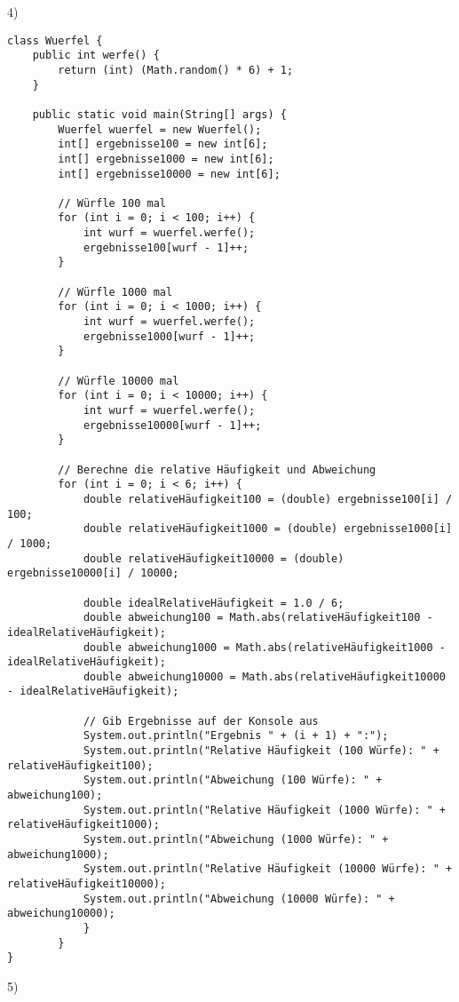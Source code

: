 \documentclass[fontsize=12pt]{article}
\begin{document}
4)
\begin{verbatim}
class Wuerfel {
    public int werfe() {
        return (int) (Math.random() * 6) + 1;
    }

    public static void main(String[] args) {
        Wuerfel wuerfel = new Wuerfel();
        int[] ergebnisse100 = new int[6];
        int[] ergebnisse1000 = new int[6];
        int[] ergebnisse10000 = new int[6];

        // Würfle 100 mal
        for (int i = 0; i < 100; i++) {
            int wurf = wuerfel.werfe();
            ergebnisse100[wurf - 1]++;
        }

        // Würfle 1000 mal
        for (int i = 0; i < 1000; i++) {
            int wurf = wuerfel.werfe();
            ergebnisse1000[wurf - 1]++;
        }

        // Würfle 10000 mal
        for (int i = 0; i < 10000; i++) {
            int wurf = wuerfel.werfe();
            ergebnisse10000[wurf - 1]++;
        }

        // Berechne die relative Häufigkeit und Abweichung
        for (int i = 0; i < 6; i++) {
            double relativeHäufigkeit100 = (double) ergebnisse100[i] / 100;
            double relativeHäufigkeit1000 = (double) ergebnisse1000[i] / 1000;
            double relativeHäufigkeit10000 = (double) ergebnisse10000[i] / 10000;

            double idealRelativeHäufigkeit = 1.0 / 6;
            double abweichung100 = Math.abs(relativeHäufigkeit100 - idealRelativeHäufigkeit);
            double abweichung1000 = Math.abs(relativeHäufigkeit1000 - idealRelativeHäufigkeit);
            double abweichung10000 = Math.abs(relativeHäufigkeit10000 - idealRelativeHäufigkeit);

            // Gib Ergebnisse auf der Konsole aus
            System.out.println("Ergebnis " + (i + 1) + ":");
            System.out.println("Relative Häufigkeit (100 Würfe): " + relativeHäufigkeit100);
            System.out.println("Abweichung (100 Würfe): " + abweichung100);
            System.out.println("Relative Häufigkeit (1000 Würfe): " + relativeHäufigkeit1000);
            System.out.println("Abweichung (1000 Würfe): " + abweichung1000);
            System.out.println("Relative Häufigkeit (10000 Würfe): " + relativeHäufigkeit10000);
            System.out.println("Abweichung (10000 Würfe): " + abweichung10000);
            }
        }
}

\end{verbatim} 
5)
\end{document}
